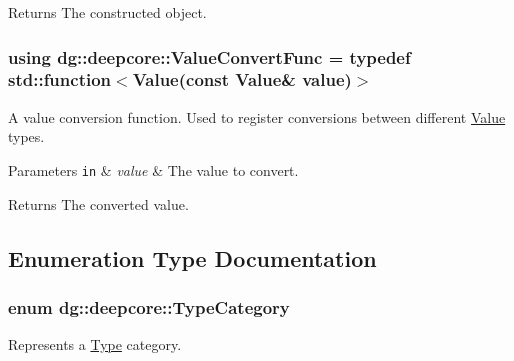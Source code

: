 \begin{DoxyReturn}{Returns}
The constructed object. 
\end{DoxyReturn}
\subsubsection[{\texorpdfstring{Value\+Convert\+Func}{ValueConvertFunc}}]{\setlength{\rightskip}{0pt plus 5cm}using {\bf dg\+::deepcore\+::\+Value\+Convert\+Func} = typedef std\+::function$<$Value(const Value\& value)$>$}\hypertarget{group___process_type_ga213a2a633d6658f67842bd2958c82c78}{}\label{group___process_type_ga213a2a633d6658f67842bd2958c82c78}


A value conversion function. Used to register conversions between different \hyperlink{classdg_1_1deepcore_1_1_value}{Value} types. 


\begin{DoxyParams}[1]{Parameters}
\mbox{\tt in}  & {\em value} & The value to convert. \\
\hline
\end{DoxyParams}
\begin{DoxyReturn}{Returns}
The converted value. 
\end{DoxyReturn}


\subsection{Enumeration Type Documentation}
\subsubsection[{\texorpdfstring{Type\+Category}{TypeCategory}}]{\setlength{\rightskip}{0pt plus 5cm}enum {\bf dg\+::deepcore\+::\+Type\+Category}\hspace{0.3cm}{\ttfamily [strong]}}\hypertarget{group___process_type_ga7df7aa6573baa85be9bbbf9b5916f038}{}\label{group___process_type_ga7df7aa6573baa85be9bbbf9b5916f038}


Represents a \hyperlink{classdg_1_1deepcore_1_1_type}{Type} category. 

